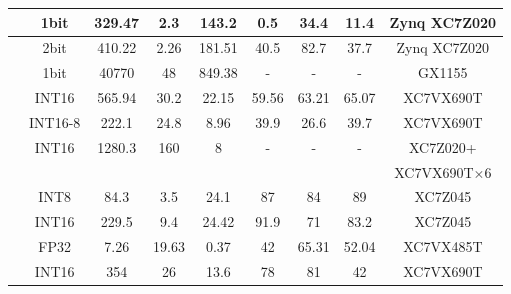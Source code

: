 \begin{table}[htbp]
\begin{tabular}{|r|c|c|c|c|c|c|c|c|}
            \cite{nakahara2017fully} & 1bit  & 329.47 & 2.3   & 143.2 & 0.5   & 34.4  & 11.4  & Zynq XC7Z020 \\ \hline
            \cite{jiao2017accelerating} & 2bit  & 410.22 & 2.26  & 181.51 & 40.5  & 82.7  & 37.7  & Zynq XC7Z020 \\ \hline
            \cite{moss2017high} & 1bit  & 40770 & 48    & 849.38 &   -   &   -   &   -   & GX1155 \\ \hline
            \cite{li2016high} & INT16 & 565.94 & 30.2  & 22.15 & 59.56 & 63.21 & 65.07 & XC7VX690T \\ \hline
            \cite{liu2016automatic} & INT16-8 & 222.1 & 24.8  & 8.96  & 39.9  & 26.6  & 39.7  & XC7VX690T \\ \hline
        \multicolumn{1}{|c|}{\multirow{2}[0]{*}{\cite{zhang2016energy}}} & \multirow{2}[0]{*}{INT16} & \multirow{2}[0]{*}{1280.3} & \multirow{2}[0]{*}{160} & \multirow{2}[0]{*}{8} & \multirow{2}[0]{*}{-} & \multirow{2}[0]{*}{-} & \multirow{2}[0]{*}{-} & XC7Z020+ \\
        \multicolumn{1}{|c|}{} &       &       &       &       &       &       &       & XC7VX690T$\times$6 \\ \hline
            \cite{guo2017angel} & INT8  & 84.3  & 3.5   & 24.1  & 87    & 84    & 89    & XC7Z045 \\ \hline
            \cite{xiao2017exploring} & INT16 & 229.5 & 9.4   & 24.42 & 91.9  & 71    & 83.2  & XC7Z045 \\ \hline
            \cite{guan2017fpga} & FP32  & 7.26  & 19.63 & 0.37  & 42    & 65.31 & 52.04 & XC7VX485T \\ \hline
            \cite{zhang2016caffeine} & INT16 & 354   & 26    & 13.6  & 78    & 81    & 42    & XC7VX690T \\ \hline
        \end{tabular}%
    \label{tab:hardware_list}%
  \end{table}%
